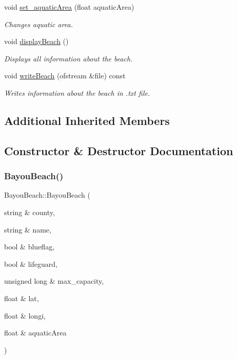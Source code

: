 \begin{DoxyCompactItemize}
void \hyperlink{class_bayou_beach_a45c742927ddd735983e92a89c7baba96}{set\+\_\+aquatic\+Area} (float aquatic\+Area)
\begin{DoxyCompactList}\small\item\em Changes aquatic area. \end{DoxyCompactList}\item 
\mbox{\label{class_bayou_beach_a4dc1d41b1884873288cb9e5fb567726f}} 
void \hyperlink{class_bayou_beach_a4dc1d41b1884873288cb9e5fb567726f}{display\+Beach} ()
\begin{DoxyCompactList}\small\item\em Displays all information about the beach. \end{DoxyCompactList}\item 
void \hyperlink{class_bayou_beach_a16b3abbe3c2ebb1558d565f63178206a}{write\+Beach} (ofstream \&file) const
\begin{DoxyCompactList}\small\item\em Writes information about the beach in .txt file. \end{DoxyCompactList}\end{DoxyCompactItemize}
\subsection*{Additional Inherited Members}


\subsection{Constructor \& Destructor Documentation}
\mbox{\label{class_bayou_beach_a2d0c9a103748bbb90aaa772daa61f0c7}} 
\subsubsection{\texorpdfstring{Bayou\+Beach()}{BayouBeach()}\hspace{0.1cm}{\footnotesize\ttfamily [1/2]}}
{\footnotesize\ttfamily Bayou\+Beach\+::\+Bayou\+Beach (\begin{DoxyParamCaption}\item[{string \&}]{county,  }\item[{string \&}]{name,  }\item[{bool \&}]{blueflag,  }\item[{bool \&}]{lifeguard,  }\item[{unsigned long \&}]{max\+\_\+capacity,  }\item[{float \&}]{lat,  }\item[{float \&}]{longi,  }\item[{float \&}]{aquatic\+Area }\end{DoxyParamCaption})}



